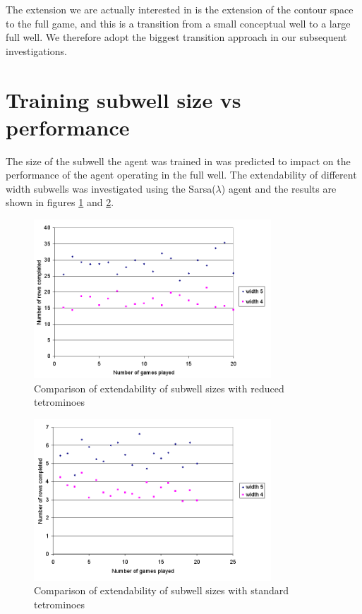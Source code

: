 \documentclass{rucsthesis}
\begin{document}
The extension we are actually interested in is the extension of the contour space to the full game, and this is a transition from a small conceptual well to a large full well. We therefore adopt the biggest transition approach in our subsequent investigations.

\section{Training subwell size vs performance}

The size of the subwell the agent was trained in was predicted to impact on the performance of the agent operating in the full well. The extendability of different width subwells was investigated using the Sarsa($\lambda$) agent and the results are shown in figures \ref{fig:widthcomparrison} and \ref{fig:widthcomparrisonfulltet}.

\begin{figure}[h]
\centering
\includegraphics[width=3.5in]{widthcomparrison.png}
\caption{Comparison of extendability of subwell sizes with reduced tetrominoes}
\label{fig:widthcomparrison}
\end{figure}

\begin{figure}[h]
\centering
\includegraphics[width=3.5in]{widthcomparrisonfulltet.png}
\caption{Comparison of extendability of subwell sizes with standard tetrominoes}
\label{fig:widthcomparrisonfulltet}
\end{figure}
\end{document}
